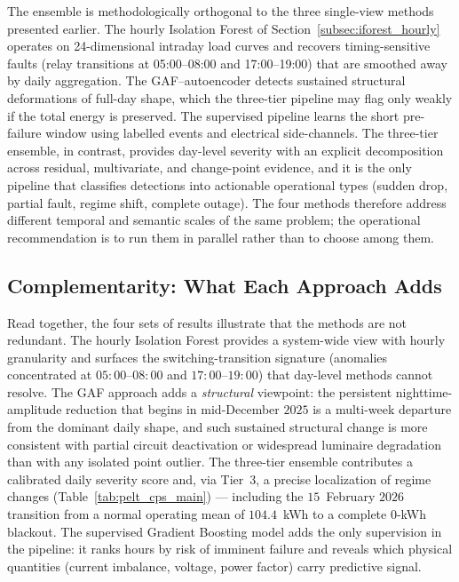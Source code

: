 \documentclass{article}
\begin{document}
The ensemble is methodologically orthogonal to the three single-view methods presented earlier. The hourly Isolation Forest of Section~\ref{subsec:iforest_hourly} operates on 24-dimensional intraday load curves and recovers timing-sensitive faults (relay transitions at 05:00--08:00 and 17:00--19:00) that are smoothed away by daily aggregation. The GAF--autoencoder detects sustained structural deformations of full-day shape, which the three-tier pipeline may flag only weakly if the total energy is preserved. The supervised pipeline learns the short pre-failure window using labelled events and electrical side-channels. The three-tier ensemble, in contrast, provides day-level severity with an explicit decomposition across residual, multivariate, and change-point evidence, and it is the only pipeline that classifies detections into actionable operational types (sudden drop, partial fault, regime shift, complete outage). The four methods therefore address different temporal and semantic scales of the same problem; the operational recommendation is to run them in parallel rather than to choose among them.


\subsection{Complementarity: What Each Approach Adds}

Read together, the four sets of results illustrate that the methods are not redundant. The hourly Isolation Forest provides a system-wide view with hourly granularity and surfaces the switching-transition signature (anomalies concentrated at $05{:}00$--$08{:}00$ and $17{:}00$--$19{:}00$) that day-level methods cannot resolve. The GAF approach adds a \emph{structural} viewpoint: the persistent nighttime-amplitude reduction that begins in mid-December $2025$ is a multi-week departure from the dominant daily shape, and such sustained structural change is more consistent with partial circuit deactivation or widespread luminaire degradation than with any isolated point outlier. The three-tier ensemble contributes a calibrated daily severity score and, via Tier~3, a precise localization of regime changes (Table~\ref{tab:pelt_cps_main}) --- including the $15$~February $2026$ transition from a normal operating mean of $104.4$~kWh to a complete $0$-kWh blackout. The supervised Gradient Boosting model adds the only supervision in the pipeline: it ranks hours by risk of imminent failure and reveals which physical quantities (current imbalance, voltage, power factor) carry predictive signal.
\end{document}
